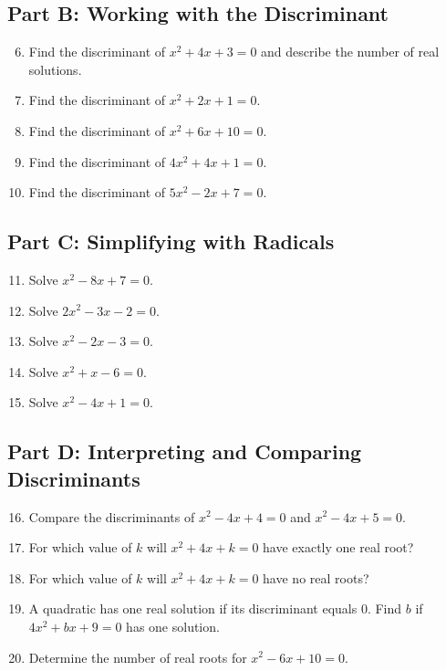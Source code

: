 \documentclass[14pt]{extarticle}
\begin{document}
\subsection*{Part B: Working with the Discriminant}
\begin{enumerate}
  \setcounter{enumi}{5}
  \item Find the discriminant of \(x^2 + 4x + 3 = 0\) and describe the number of real solutions.
  \item Find the discriminant of \(x^2 + 2x + 1 = 0.\)
  \item Find the discriminant of \(x^2 + 6x + 10 = 0.\)
  \item Find the discriminant of \(4x^2 + 4x + 1 = 0.\)
  \item Find the discriminant of \(5x^2 - 2x + 7 = 0.\)
\end{enumerate}

\subsection*{Part C: Simplifying with Radicals}
\begin{enumerate}
  \setcounter{enumi}{10}
  \item Solve \(x^2 - 8x + 7 = 0.\)
  \item Solve \(2x^2 - 3x - 2 = 0.\)
  \item Solve \(x^2 - 2x - 3 = 0.\)
  \item Solve \(x^2 + x - 6 = 0.\)
  \item Solve \(x^2 - 4x + 1 = 0.\)
\end{enumerate}

\subsection*{Part D: Interpreting and Comparing Discriminants}
\begin{enumerate}
  \setcounter{enumi}{15}
  \item Compare the discriminants of \(x^2 - 4x + 4 = 0\) and \(x^2 - 4x + 5 = 0.\)
  \item For which value of \(k\) will \(x^2 + 4x + k = 0\) have exactly one real root?
  \item For which value of \(k\) will \(x^2 + 4x + k = 0\) have no real roots?
  \item A quadratic has one real solution if its discriminant equals 0. Find \(b\) if \(4x^2 + bx + 9 = 0\) has one solution.
  \item Determine the number of real roots for \(x^2 - 6x + 10 = 0.\)
\end{enumerate}
\end{document}
